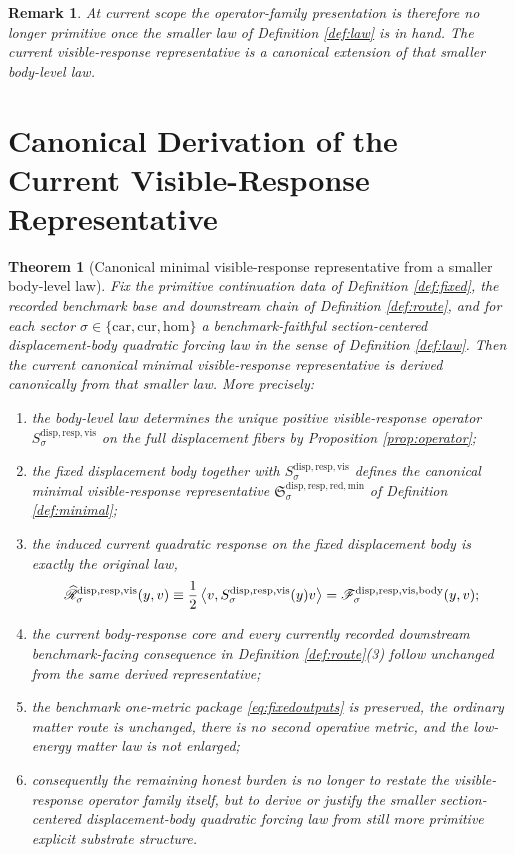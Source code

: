 \documentclass[11pt]{article}
\newcommand{\Car}{\mathrm{car}}
\newcommand{\Cur}{\mathrm{cur}}
\newcommand{\Hom}{\mathrm{hom}}
\newcommand{\VisibleBodyForcingLaw}[1]{\mathscr F_{#1}^{\mathrm{disp,resp,vis,body}}}
\newcommand{\CoreForcedBodyResponse}[1]{\widehat{\mathscr R}_{#1}^{\mathrm{disp,resp,vis}}}
\newcommand{\VisibleResponseOperator}[1]{S_{#1}^{\mathrm{disp,resp,vis}}}
\newcommand{\MinimalReducedStructure}{\mathfrak S^{\mathrm{disp,resp,red,min}}}
\newtheorem{remark}{Remark}
\newtheorem{theorem}{Theorem}
\begin{document}
\begin{remark}
At current scope the operator-family presentation is therefore no longer primitive once the smaller law of Definition \ref{def:law} is in hand. The current visible-response representative is a canonical extension of that smaller body-level law.
\end{remark}

\section{Canonical Derivation of the Current Visible-Response Representative}

\begin{theorem}[Canonical minimal visible-response representative from a smaller body-level law]
\label{thm:main}
Fix the primitive continuation data of Definition \ref{def:fixed}, the recorded benchmark base and downstream chain of Definition \ref{def:route}, and for each sector \(\sigma\in\{\Car,\Cur,\Hom\}\) a benchmark-faithful section-centered displacement-body quadratic forcing law in the sense of Definition \ref{def:law}. Then the current canonical minimal visible-response representative is derived canonically from that smaller law. More precisely:
\begin{enumerate}
    \item the body-level law determines the unique positive visible-response operator \(\VisibleResponseOperator{\sigma}\) on the full displacement fibers by Proposition \ref{prop:operator};
    \item the fixed displacement body together with \(\VisibleResponseOperator{\sigma}\) defines the canonical minimal visible-response representative \(\MinimalReducedStructure_{\sigma}\) of Definition \ref{def:minimal};
    \item the induced current quadratic response on the fixed displacement body is exactly the original law,
    \[
    \CoreForcedBodyResponse{\sigma}(y,v)
    \equiv
    \frac{1}{2}\ev{v,\VisibleResponseOperator{\sigma}(y)v}
    =
    \VisibleBodyForcingLaw{\sigma}(y,v);
    \]
    \item the current body-response core and every currently recorded downstream benchmark-facing consequence in Definition \ref{def:route}(3) follow unchanged from the same derived representative;
    \item the benchmark one-metric package \eqref{eq:fixedoutputs} is preserved, the ordinary matter route is unchanged, there is no second operative metric, and the low-energy matter law is not enlarged;
    \item consequently the remaining honest burden is no longer to restate the visible-response operator family itself, but to derive or justify the smaller section-centered displacement-body quadratic forcing law from still more primitive explicit substrate structure.
\end{enumerate}
\end{theorem}
\end{document}
